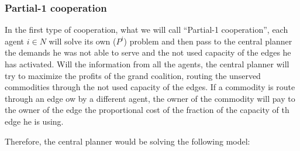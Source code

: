 \documentclass{article}
\begin{document}
\subsubsection*{Partial-1 cooperation}


In the first type of cooperation, what we will call ``Partial-1 cooperation'', each agent $i\in N$ will solve its own ($P^i$) problem and 
then pass to the central planner the demands he was not able to serve and the not used capacity of the 
edges he has activated. Will the information from all the agents, the central planner will try to maximize
the profits of the grand coalition, routing the unserved commodities through the not used capacity
of the edges. If a commodity is route through an edge ow by a different agent, the owner of the commodity
will pay to the owner of the edge the proportional cost of the fraction of the capacity of th edge he is using.

Therefore, the central planner would be solving the following model:
\end{document}
